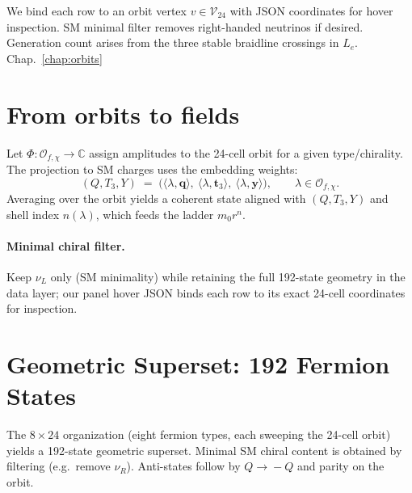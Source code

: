We bind each row to an orbit vertex $v\in\mathcal{V}_{24}$ with JSON coordinates for hover inspection.
SM minimal filter removes right-handed neutrinos if desired. Generation count arises from the three stable braidline crossings in $L_e$.
Chap.~\ref{chap:orbits}

\section{From orbits to fields}
Let $\Phi:\mathcal{O}_{f,\chi}\to \mathbb{C}$ assign amplitudes to the 24-cell orbit for a given type/chirality. The projection to SM charges uses the embedding weights:
\[
(Q,T_3,Y)\;=\;\big(\langle \lambda,\mathbf{q}\rangle,\ \langle\lambda,\mathbf{t}_3\rangle,\ \langle\lambda,\mathbf{y}\rangle\big),\qquad \lambda\in\mathcal{O}_{f,\chi}.
\]
Averaging over the orbit yields a coherent state aligned with $(Q,T_3,Y)$ and shell index $n(\lambda)$, which feeds the ladder $m_0 r^{n}$.

\paragraph{Minimal chiral filter.}
Keep $\nu_L$ only (SM minimality) while retaining the full 192-state geometry in the data layer; our panel hover JSON binds each row to its exact 24-cell coordinates for inspection.
\section*{Geometric Superset: 192 Fermion States}
\noindent The $8\times 24$ organization (eight fermion types, each sweeping the 24-cell orbit) yields a 192-state geometric superset. Minimal SM chiral content is obtained by filtering (e.g.\ remove $\nu_R$). Anti-states follow by $Q\!\to\!-Q$ and parity on the orbit.


